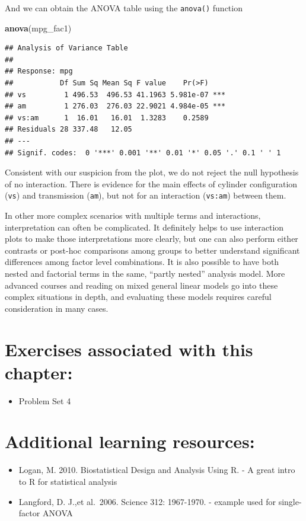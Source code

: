 \documentclass[]{book}
\newenvironment{Shaded}{\begin{snugshade}}{\end{snugshade}}
\newcommand{\KeywordTok}[1]{\textcolor[rgb]{0.13,0.29,0.53}{\textbf{#1}}}
\newcommand{\NormalTok}[1]{#1}
\providecommand{\tightlist}{%
  \setlength{\itemsep}{0pt}\setlength{\parskip}{0pt}}
\begin{document}
And we can obtain the ANOVA table using the \texttt{anova()} function

\begin{Shaded}
\begin{Highlighting}[]
\KeywordTok{anova}\NormalTok{(mpg_fac1)}
\end{Highlighting}
\end{Shaded}

\begin{verbatim}
## Analysis of Variance Table
## 
## Response: mpg
##           Df Sum Sq Mean Sq F value    Pr(>F)    
## vs         1 496.53  496.53 41.1963 5.981e-07 ***
## am         1 276.03  276.03 22.9021 4.984e-05 ***
## vs:am      1  16.01   16.01  1.3283    0.2589    
## Residuals 28 337.48   12.05                      
## ---
## Signif. codes:  0 '***' 0.001 '**' 0.01 '*' 0.05 '.' 0.1 ' ' 1
\end{verbatim}

Consistent with our suspicion from the plot, we do not reject the null hypothesis of no interaction. There is evidence for the main effects of cylinder configuration (\texttt{vs}) and transmission (\texttt{am}), but not for an interaction (\texttt{vs:am}) between them.

In other more complex scenarios with multiple terms and interactions, interpretation can often be complicated. It definitely helps to use interaction plots to make those interpretations more clearly, but one can also perform either contrasts or post-hoc comparisons among groups to better understand significant differences among factor level combinations. It is also possible to have both nested and factorial terms in the same, ``partly nested'' analysis model. More advanced courses and reading on mixed general linear models go into these complex situations in depth, and evaluating these models requires careful consideration in many cases.

\hypertarget{exercises-associated-with-this-chapter-8}{%
\section{Exercises associated with this chapter:}\label{exercises-associated-with-this-chapter-8}}

\begin{itemize}
\tightlist
\item
  Problem Set 4
\end{itemize}

\hypertarget{additional-learning-resources-8}{%
\section{Additional learning resources:}\label{additional-learning-resources-8}}

\begin{itemize}
\item
  Logan, M. 2010. Biostatistical Design and Analysis Using R. - A great intro to R for statistical analysis
\item
  Langford, D. J.,et al.~2006. Science 312: 1967-1970. - example used for single-factor ANOVA
\end{itemize}


\end{document}
